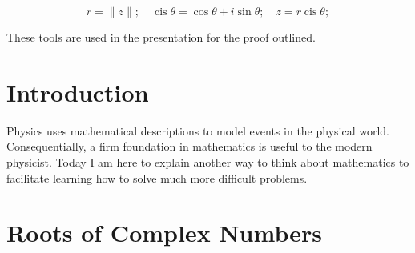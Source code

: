 \documentclass[12pt]{article}
\DeclareMathOperator\cis{cis} %
\begin{document}
\[ r = \lVert z \rVert; \quad \cis{\theta} = \cos{\theta} + i\sin{\theta}; \quad z = r\cis{\theta};\]

These tools are used in the presentation for the proof outlined.

\cleardoublepage

\tableofcontents
\thispagestyle{empty}
\cleardoublepage

\setcounter{page}{1}
\section{Introduction}\label{sec:Intro}

Physics uses mathematical descriptions to model events in the physical world. Consequentially, a firm foundation in mathematics is useful to the modern physicist. Today I am here to explain another way to think about mathematics to facilitate learning how to solve much more difficult problems.

\section{Roots of Complex Numbers}



\cleardoublepage
\end{document}

